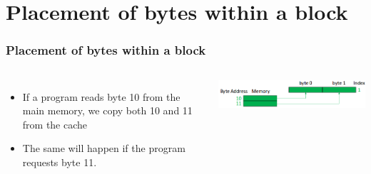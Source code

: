 \documentclass{beamer}
\begin{document}
\section{Placement of bytes within a block}
\begin{frame}
\frametitle{Placement of bytes within a block}
\begin{columns}[c]
\begin{itemize}
\item If a program reads byte 10 from the main memory, we copy both 10 and 11 from the cache
\item The same will happen if the program requests byte 11.
\end{itemize}
\includegraphics[scale=0.4]{placement.png}
\end{columns}
\end{frame}
\end{document}
